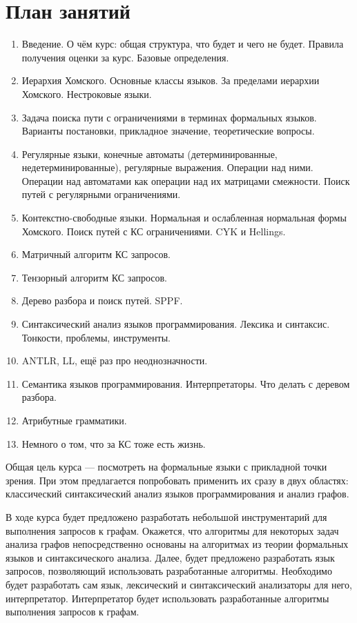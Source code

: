 \section{План занятий}
\begin{enumerate}
  \item Введение. О чём курс: общая структура, что будет и чего не будет. Правила получения оценки за курс. Базовые определения.
  \item Иерархия Хомского. Основные классы языков. За пределами иерархии Хомского. Нестроковые языки.
  \item Задача поиска пути с ограничениями в терминах формальных языков. Варианты постановки, прикладное значение, теоретические вопросы.
  \item Регулярные языки, конечные автоматы (детерминированные, недетерминированные), регулярные выражения. Операции над ними. Операции над автоматами как операции над их матрицами смежности. Поиск путей с регулярными ограничениями.
  \item Контекстно-свободные языки. Нормальная и ослабленная нормальная формы Хомского. Поиск путей с КС ограничениями. CYK и Hellings.
  \item Матричный алгоритм КС запросов.
  \item Тензорный алгоритм КС запросов.
  \item Дерево разбора и поиск путей. SPPF.
  \item Синтаксический анализ языков программирования. Лексика и синтаксис. Тонкости, проблемы, инструменты.
  \item ANTLR, LL, ещё раз про неоднозначности.
  \item Семантика языков программирования. Интерпретаторы. Что делать с деревом разбора.
  \item Атрибутные грамматики.
  \item Немного о том, что за КС тоже есть жизнь.
\end{enumerate}


Общая цель курса --- посмотреть на формальные языки с прикладной точки зрения. При этом предлагается попробовать применить их сразу в двух областях: классический синтаксический анализ языков программирования и анализ графов.

В ходе курса будет предложено разработать небольшой инструментарий для выполнения запросов к графам. Окажется, что алгоритмы для некоторых задач анализа графов непосредственно основаны на алгоритмах из теории формальных языков и синтаксического анализа. Далее, будет предложено разработать язык запросов, позволяющий использовать разработанные алгоритмы. Необходимо будет разработать сам язык, лексический и синтаксический  анализаторы для него, интерпретатор. Интерпретатор будет использовать разработанные алгоритмы выполнения запросов к графам.

